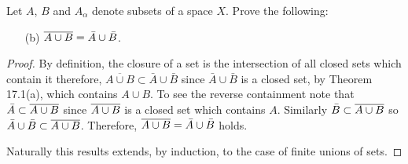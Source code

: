 \newpage
\begin{problem}[Munkres \S17, p.\,101, 6(b)]
Let $A$, $B$ and $A_\alpha$ denote subsets of a space $X$. Prove
the following:
\begin{enumerate}[noitemsep]
\item[(b)] $\overline{A\cup B}=\bar A\cup\bar B$.
\end{enumerate}
\end{problem}
\begin{proof}
By definition, the closure of a set is the intersection of all
closed sets which contain it therefore, $\overline{A\cup
  B}\subset\bar A\cup\bar B$ since $\bar A\cup\bar B$ is a
closed set, by Theorem 17.1(a), which contains $A\cup B$. To see
the reverse containment note that $\bar A\subset\overline{A\cup B}$
since $\overline{A\cup B}$ is a closed set which contains
$A$. Similarly $\bar B\subset\overline{A\cup B}$ so $\bar A\cup \bar
B\subset\overline{A\cup B}$. Therefore, $\overline{A\cup B}=\bar
A\cup\bar B$ holds.

Naturally this results extends, by induction, to the case of
finite unions of sets.
\end{proof}

